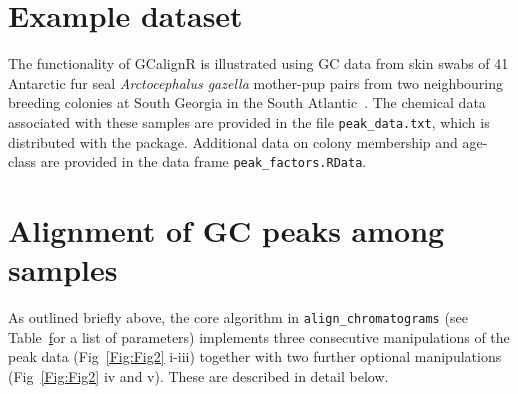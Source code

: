 \documentclass[10pt,letterpaper]{article}
\begin{document}
\section*{Example dataset}
The functionality of GCalignR is illustrated using GC data from skin swabs of 41 Antarctic fur seal \textit{Arctocephalus gazella} mother-pup pairs from two neighbouring breeding colonies at South Georgia in the South Atlantic~\cite{Stoffel.2015}. The chemical data associated with these samples are provided in the file \texttt{peak\_data.txt}, which is distributed with the package. Additional data on colony membership and age-class are provided in the data frame \texttt{peak\_factors.RData}.

\section*{Alignment of GC peaks among samples}
As outlined briefly above, the core algorithm in \texttt{align\_chromatograms} (see Table~\href{table:table1} for a list of parameters) implements three consecutive manipulations of the peak data (Fig~\ref{Fig:Fig2} i-iii) together with two further optional manipulations (Fig~\ref{Fig:Fig2} iv and v). These are described in detail below.
\end{document}
